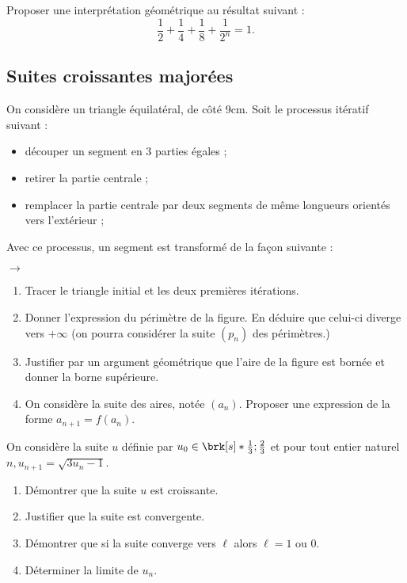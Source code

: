 \documentclass[12pt,a4paper,french]{article}
\begin{document}
\begin{question}
  Proposer une interprétation géométrique au résultat suivant : \[
  \frac12 + \frac14 + \frac18 + \frac1{2^n} = 1. \]
\end{question}

\subsection{Suites croissantes majorées}

\begin{question}
  On considère un triangle équilatéral, de côté 9cm. Soit le processus
  itératif suivant :
  \begin{itemize}
    \item découper un segment en 3 parties égales ;
    \item retirer la partie centrale ;
    \item remplacer la partie centrale par deux segments de même longueurs
      orientés vers l'extérieur ;
  \end{itemize}
  Avec ce processus, un segment est transformé de la façon suivante :

  \begin{center}
     $\rightarrow$ 
  \end{center}
  \begin{enumerate}
    \item Tracer le triangle initial et les deux premières itérations.
    \item Donner l'expression du périmètre de la figure. En déduire que
      celui-ci diverge vers $+\infty$ (on pourra considérer la suite $(p_n)$
      des périmètres.)
    \item Justifier par un argument géométrique que l'aire de la figure est
      bornée et donner la borne supérieure.
    \item On considère la suite des aires, notée $(a_n)$. Proposer une
      expression de la forme $a_{n+1} = f(a_n)$.
  \end{enumerate}
\end{question}

\begin{question}
  On considère la suite $u$ définie par $u_0 \in \brk[s]*{\frac13 ; \frac23}$
  et pour tout entier naturel $n, u_{n+1} = \sqrt{3u_n - 1}$.
  \begin{enumerate}
    \item Démontrer que la suite $u$ est croissante.
    \item Justifier que la suite est convergente.
    \item Démontrer que si la suite converge vers $\ell$ alors $\ell = 1$ ou
      0.
    \item Déterminer la limite de $u_n$.
  \end{enumerate}
\end{question}
\end{document}
